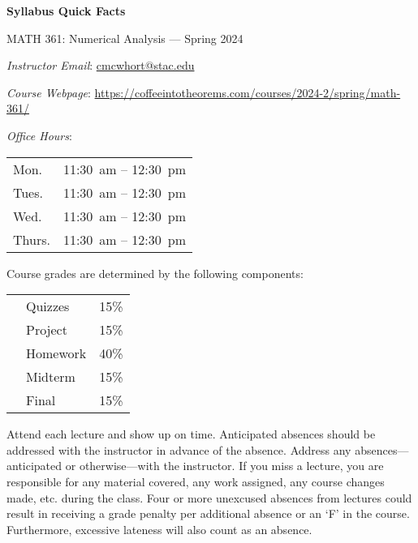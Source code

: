 \documentclass[11pt,letterpaper]{article}
\begin{document}
\begin{center} 
\bfseries
\color{stacred}
\LARGE Syllabus Quick Facts \par\vspace{0.2\baselineskip}
\Large MATH 361: Numerical Analysis --- Spring 2024
\end{center} \pspace


\hspace{0.53cm} {\itshape Instructor Email}: \href{mailto:cmcwhort@stac.edu}{cmcwhort@stac.edu} \par
\hspace{0.53cm} {\itshape Course Webpage}: \href{https://coffeeintotheorems.com/courses/2024-2/spring/math-361/}{https://coffeeintotheorems.com/courses/2024-2/spring/math-361/} \par
\hspace{0.53cm} {\itshape Office Hours}: 	\par \vspace{-0.3cm}
	\begin{table}[!ht]
	\centering
	\begin{tabular}{l || l}
	Mon. & 11:30~am -- 12:30~pm \\
	Tues. & 11:30~am -- 12:30~pm \\
	Wed. & 11:30~am -- 12:30~pm \\
	Thurs. & 11:30~am -- 12:30~pm
	\end{tabular}
	\end{table}


Course grades are determined by the following components: \par \vspace{-0.3cm}
	\begin{table}[!ht]
        \begin{tabular}{clr}
        & Quizzes & 15\% \\
        & Project & 15\% \\
        & Homework & 40\% \\
        & Midterm & 15\% \\
        & Final & 15\%
        \end{tabular} 
        \end{table}


Attend each lecture and show up on time. Anticipated absences should be addressed with the instructor in advance of the absence. Address any absences---anticipated or otherwise---with the instructor. If you miss a lecture, you are responsible for any material covered, any work assigned, any course changes made, etc. during the class. Four or more unexcused absences from lectures could result in receiving a grade penalty per additional absence or an `F' in the course. Furthermore, excessive lateness will also count as an absence. \pspace
\end{document}
